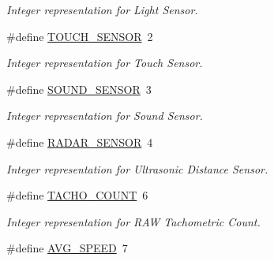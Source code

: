 \begin{DoxyCompactItemize}
\begin{DoxyCompactList}\small\item\em Integer representation for Light Sensor. \item\end{DoxyCompactList}\item 
\hypertarget{group___bro_fist_ga07dfd45c90480d3fe7e3087b27fbae30}{
\#define \hyperlink{group___bro_fist_ga07dfd45c90480d3fe7e3087b27fbae30}{TOUCH\_\-SENSOR}~2}
\label{group___bro_fist_ga07dfd45c90480d3fe7e3087b27fbae30}

\begin{DoxyCompactList}\small\item\em Integer representation for Touch Sensor. \item\end{DoxyCompactList}\item 
\hypertarget{group___bro_fist_ga1d947f2b23c11298bc35257662b889d3}{
\#define \hyperlink{group___bro_fist_ga1d947f2b23c11298bc35257662b889d3}{SOUND\_\-SENSOR}~3}
\label{group___bro_fist_ga1d947f2b23c11298bc35257662b889d3}

\begin{DoxyCompactList}\small\item\em Integer representation for Sound Sensor. \item\end{DoxyCompactList}\item 
\hypertarget{group___bro_fist_gaa4c23c22caf8a93547a5ba985d60a933}{
\#define \hyperlink{group___bro_fist_gaa4c23c22caf8a93547a5ba985d60a933}{RADAR\_\-SENSOR}~4}
\label{group___bro_fist_gaa4c23c22caf8a93547a5ba985d60a933}

\begin{DoxyCompactList}\small\item\em Integer representation for Ultrasonic Distance Sensor. \item\end{DoxyCompactList}\item 
\hypertarget{group___bro_fist_gae2b68429d85a4e53be661aa29f5fad81}{
\#define \hyperlink{group___bro_fist_gae2b68429d85a4e53be661aa29f5fad81}{TACHO\_\-COUNT}~6}
\label{group___bro_fist_gae2b68429d85a4e53be661aa29f5fad81}

\begin{DoxyCompactList}\small\item\em Integer representation for RAW Tachometric Count. \item\end{DoxyCompactList}\item 
\hypertarget{group___bro_fist_ga102b03f1e7083e6ec238c864fc438e18}{
\#define \hyperlink{group___bro_fist_ga102b03f1e7083e6ec238c864fc438e18}{AVG\_\-SPEED}~7}
\label{group___bro_fist_ga102b03f1e7083e6ec238c864fc438e18}


\end{DoxyCompactItemize}
